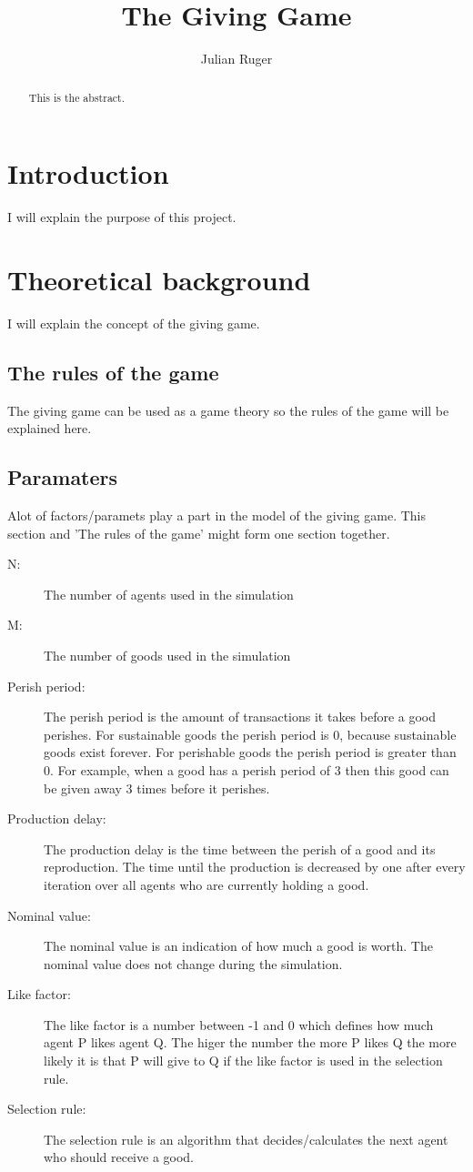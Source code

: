 \documentclass[twoside,openright]{uva-bachelor-thesis}
\title{The Giving Game}
\author{Julian Ruger}
\begin{document}
\maketitle

\begin{abstract}
This is the abstract. 
\end{abstract}

\tableofcontents

\chapter{Introduction}
I will explain the purpose of this project.

\chapter{Theoretical background}
I will explain the concept of the giving game.

\section{The rules of the game}
The giving game can be used as a game theory so the rules of the game will be explained here.

\section{Paramaters}
Alot of factors/paramets play a part in the model of the giving game. This section and 'The rules of the game' might form one section together.

\begin{description}
  \item[N:] The number of agents used in the simulation
  \item[M:] The number of goods used in the simulation
  \item[Perish period:] The perish period is the amount of transactions it takes before a good perishes. For sustainable goods the perish period is 0, because sustainable goods exist forever. For perishable goods the perish period is greater than 0. For example, when a good has a perish period of 3 then this good can be given away 3 times before it perishes.
  \item[Production delay:] The production delay is the time between the perish of a good and its reproduction. The time until the production is decreased by one after every iteration over all agents who are currently holding a good.
  \item[Nominal value:] The nominal value is an indication of how much a good is worth. The nominal value does not change during the simulation.
  \item[Like factor:] The like factor is a number between -1 and 0 which defines how much agent P likes agent Q. The higer the number the more P likes Q the more likely it is that P will give to Q if the like factor is used in the selection rule.
  \item[Selection rule:] The selection rule is an algorithm that decides/calculates the next agent who should receive a good.

\end{description}
\end{document}
